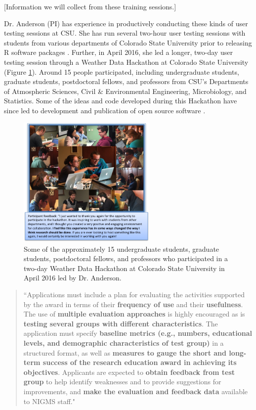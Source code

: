 \documentclass[pdftex,english,11pt,parskip=half]{scrartcl}
\begin{document}
[Information we will collect from these training sessions.]

Dr. Anderson (PI) has experience in productively conducting these kinds of user
testing sessions at CSU. She has run several two-hour user testing sessions with
students from various departments of Colorado State University prior to
releasing R software packages \cite{futureheatwaves, countyweather}. Further, in
April 2016, she led a longer, two-day user testing session through a Weather
Data Hackathon at Colorado State University (Figure \ref{csu-r-hackathon}).
Around 15 people participated, including undergraduate students, graduate
students, postdoctoral fellows, and professors from CSU's Departments of
Atmospheric Sciences, Civil \& Environmental Engineering, Microbiology, and
Statistics. Some of the ideas and code developed during this Hackathon have
since led to development and publication of open source software
\cite{countyfloods, noaastormevents}.

\begin{figure} \centering \includegraphics[width =
0.6\textwidth]{figures/csu_hackathon.png} \caption{Some of the approximately 15
undergraduate students, graduate students, postdoctoral fellows, and professors
who participated in a two-day Weather Data Hackathon at Colorado State
University in April 2016 led by Dr. Anderson.} \label{csu-r-hackathon}
\end{figure}

\begin{quotation} ``Applications must include a plan for evaluating the
activities supported by the award in terms of their \textbf{frequency of use}
and their \textbf{usefulness}. The use of \textbf{multiple evaluation
approaches} is highly encouraged as is \textbf{testing several groups with
different characteristics}. The application must specify \textbf{baseline
metrics (e.g., numbers, educational levels, and demographic characteristics of
test group)} in a structured format, as well as \textbf{measures to gauge the
short and long-term success of the research education award in achieving its
objectives}. Applicants are expected to \textbf{obtain feedback from test group}
to help identify weaknesses and to provide suggestions for improvements, and
\textbf{make the evaluation and feedback data} available to NIGMS staff."
\end{quotation}
\end{document}
